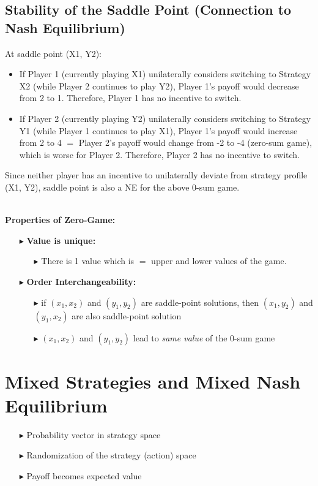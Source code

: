 \documentclass[../Main.tex]{subfiles}
\begin{document}
\subsection*{Stability of the Saddle Point (Connection to Nash Equilibrium)}{
At saddle point (X1, Y2):
\begin{itemize}
    \item If Player 1 (currently playing X1) unilaterally considers switching to Strategy X2 (while Player 2 continues to play Y2), Player 1's payoff would decrease from 2 to 1. Therefore, Player 1 has no incentive to switch.
    \item If Player 2 (currently playing Y2) unilaterally considers switching to Strategy Y1 (while Player 1 continues to play X1), Player 1's payoff would increase from 2 to 4 $=$ Player 2's payoff would change from -2 to -4 (zero-sum game), which is worse for Player 2. Therefore, Player 2 has no incentive to switch.
\end{itemize}
Since neither player has an incentive to unilaterally deviate from strategy profile (X1, Y2), saddle point is also a NE for the above 0-sum game.}\\

\textbf{Properties of Zero-Game:}
\begin{itemize}
    \item[$\blacktriangleright$] \textbf{Value is unique:}
    \begin{itemize}
        \item[$\blacktriangleright$] There is 1 value which is $=$ upper and lower values of the game.
    \end{itemize}
    \item[$\blacktriangleright$] \textbf{Order Interchangeability:}
    \begin{itemize}
        \item[$\blacktriangleright$] if $(x_1, x_2)$ and $(y_1, y_2)$ are saddle-point solutions, then $(x_1, y_2)$ and $(y_1, x_2)$ are also saddle-point solution
        \item[$\blacktriangleright$] $(x_1, x_2)$ and $(y_1, y_2)$ lead to \textit{same value} of the 0-sum game
    \end{itemize}
\end{itemize}

\section{Mixed Strategies and Mixed Nash Equilibrium}
\begin{itemize}
    \item[$\blacktriangleright$] Probability vector in strategy space
    \item[$\blacktriangleright$] Randomization of the strategy (action) space
    \item[$\blacktriangleright$] Payoff becomes expected value
\end{itemize}


\end{document}

